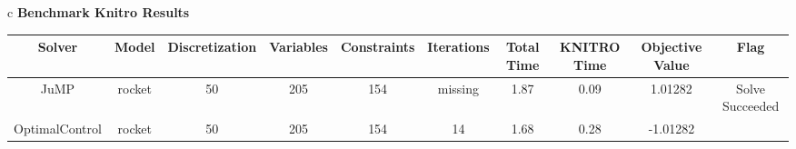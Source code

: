 \documentclass{standalone}
\begin{document}
\begin{tabular}{c}
\Large\textbf{Benchmark Knitro Results}\\
\begin{tabular}{cccccccccc}
  \hline
  \textbf{Solver} & \textbf{Model} & \textbf{Discretization} & \textbf{Variables} & \textbf{Constraints} & \textbf{Iterations} & \textbf{Total Time} & \textbf{KNITRO Time} & \textbf{Objective Value} & \textbf{Flag} \\\hline
  JuMP & rocket & 50 & 205 & 154 & missing & 1.87 & 0.09 & 1.01282 & Solve Succeeded \\
  OptimalControl & rocket & 50 & 205 & 154 & 14 & 1.68 & 0.28 & -1.01282 & \color{red}{UNI ? 0} \\\hline
\end{tabular}
\end{tabular}
\end{document}
